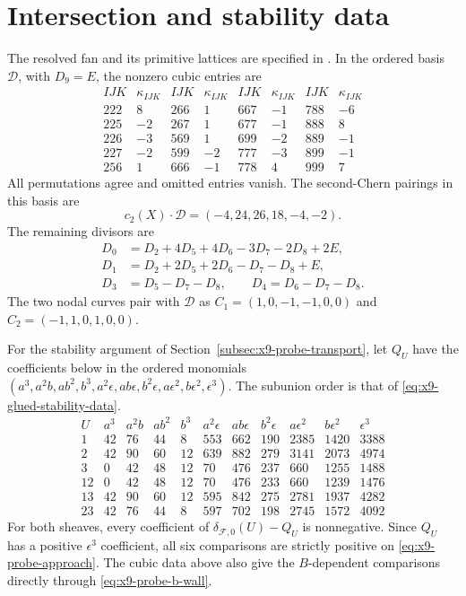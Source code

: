 \section{Intersection and stability data}
\label{app:probe-data}
The resolved fan and its primitive lattices are specified in
\cite[Appendix~B]{Wuebben:2026quantum}. In the ordered basis
$\mathcal D$, with $D_9=E$, the nonzero cubic entries are
\begin{equation}
\begin{array}{cc|cc|cc|cc}
 IJK&\kappa_{IJK}&IJK&\kappa_{IJK}&IJK&\kappa_{IJK}&IJK&\kappa_{IJK}\\\hline
 222&8&266&1&667&-1&788&-6\\
 225&-2&267&1&677&-1&888&8\\
 226&-3&569&1&699&-2&889&-1\\
 227&-2&599&-2&777&-3&899&-1\\
 256&1&666&-1&778&4&999&7
\end{array}
\label{eq:x9-full-cubic-data}
\end{equation}
All permutations agree and omitted entries vanish.
The second-Chern pairings in this basis are
\[
 c_2(X)\cdot\mathcal D=(-4,24,26,18,-4,-2).
\]
The remaining divisors are
\begin{equation}
\begin{aligned}
 D_0&=D_2+4D_5+4D_6-3D_7-2D_8+2E,\\
 D_1&=D_2+2D_5+2D_6-D_7-D_8+E,\\
 D_3&=D_5-D_7-D_8,\qquad D_4=D_6-D_7-D_8.
\end{aligned}
\end{equation}
The two nodal curves pair with $\mathcal D$ as
$C_1=(1,0,-1,-1,0,0)$ and $C_2=(-1,1,0,1,0,0)$.

For the stability argument of Section~\ref{subsec:x9-probe-transport},
let $Q_U$ have the coefficients below in the ordered monomials
$(a^3,a^2b,ab^2,b^3,a^2\epsilon,ab\epsilon,b^2\epsilon,
a\epsilon^2,b\epsilon^2,\epsilon^3)$. The subunion order is that of
\eqref{eq:x9-glued-stability-data}.
\begingroup\small\setlength{\arraycolsep}{3pt}
\begin{equation}
\begin{array}{c|rrrrrrrrrr}
 U& a^3&a^2b&ab^2&b^3&a^2\epsilon&ab\epsilon&b^2\epsilon
 &a\epsilon^2&b\epsilon^2&\epsilon^3\\\hline
 1&42&76&44&8&553&662&190&2385&1420&3388\\
 2&42&90&60&12&639&882&279&3141&2073&4974\\
 3&0&42&48&12&70&476&237&660&1255&1488\\
 12&0&42&48&12&70&476&233&660&1239&1476\\
 13&42&90&60&12&595&842&275&2781&1937&4282\\
 23&42&76&44&8&597&702&198&2745&1572&4092
\end{array}
\label{eq:x9-transport-coefficients}
\end{equation}
\endgroup
For both sheaves, every coefficient of
$\delta_{\mathcal F,0}(U)-Q_U$ is nonnegative. Since $Q_U$ has a
positive $\epsilon^3$ coefficient, all six comparisons are strictly
positive on \eqref{eq:x9-probe-approach}. The cubic data above also
give the $B$-dependent comparisons directly through
\eqref{eq:x9-probe-b-wall}.

